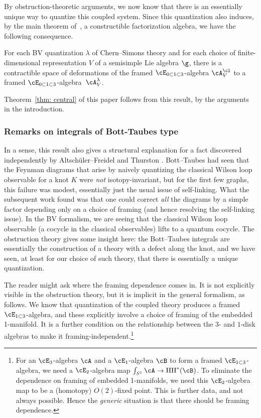 \documentclass[10pt]{amsart}
\begin{document}
By obstruction-theoretic arguments, 
we now know that there is an essentially unique way to quantize this coupled system.
Since this quantization also induces, by the main theorem of~\cite{CG2},
a constructible factorization algebra, 
we have the following consequence.


\begin{crl}
\label{crl: defect fact alg}
For each BV quantization $\lambda$ of Chern--Simons theory and for each choice of finite-dimensional representation $V$ of a semisimple Lie algebra $\g$,
there is a contractible space of deformations of the framed $\cE_{0 \subset 1 \subset 3}$-algebra $\cA^\cl_V$
to a framed $\cE_{0 \subset 1 \subset 3}$-algebra~$\cA^\lambda_V$.
\end{crl}

Theorem~\ref{thm: central} of this paper follows from this result,
by the arguments in the introduction.

\subsubsection{Remarks on integrals of Bott-Taubes type}

In a sense, this result also gives a structural explanation for a fact discovered independently by Altsch\"uler--Freidel \cite{AltFreVCS} and Thurston \cite{Thu}.
Bott--Taubes \cite{BotTau} had seen that the Feynman diagrams that arise by naively quantizing the classical Wilson loop observable for a knot $K$ were {\em not} isotopy-invariant,
but for the first few graphs, this failure was modest, essentially just the usual issue of self-linking.
What the subsequent work found was that one could correct {\em all} the diagrams by a simple factor depending only on a choice of framing (and hence resolving the self-linking issue).
In the BV formalism, we are seeing that the classical Wilson loop observable (a cocycle in the classical observables) lifts to a quantum cocycle.
The obstruction theory gives some insight here: 
the Bott--Taubes integrals are essentially the construction of a theory with a defect along the knot,
and we have seen, at least for our choice of such theory, that there is essentially a unique quantization.

The reader might ask where the framing dependence comes in.
It is not explicitly visible in the obstruction theory, 
but it is implicit in the general formalism, as follows.
We know that quantization of the coupled theory produces a framed $\cE_{1 \subset 3}$-algebra,
and these explicitly involve a choice of framing of the embedded 1-manifold.
It is a further condition on the relationship between the $3$- and $1$-disk algebras to make it framing-independent.\footnote{For an $\cE_3$-algebra $\cA$ and a $\cE_1$-algebra $\cB$ to form a framed $\cE_{1 \subset 3}$-algebra, we need a $\cE_2$-algebra map $\int_{S^1} \cA \to {\rm HH}^*(\cB)$.
To eliminate the dependence on framing of embedded 1-manifolds, we need this $\cE_2$-algebra map to be a (homotopy) $O(2)$-fixed point.
This is further data, and not always possible.
Hence the {\em generic} situation is that there should be framing dependence.}
\end{document}
